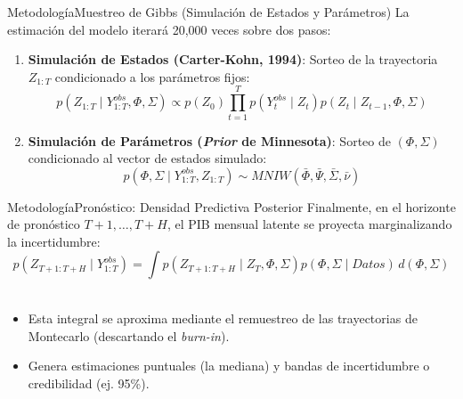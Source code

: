 \documentclass{beamer}
\begin{document}
\begin{frame}{Metodología}{Muestreo de Gibbs (Simulación de Estados y Parámetros)}\justifying
La estimación del modelo iterará 20,000 veces sobre dos pasos: \pause
\begin{enumerate}\justifying
    \item \textbf{Simulación de Estados (Carter-Kohn, 1994)}: Sorteo de la trayectoria $Z_{1:T}$ condicionado a los parámetros fijos: \pause
    \[
    p(Z_{1:T} \mid Y_{1:T}^{obs}, \Phi, \Sigma) \propto p(Z_0) \prod_{t=1}^T p(Y_t^{obs} \mid Z_t) p(Z_t \mid Z_{t-1}, \Phi, \Sigma)
    \] \pause
    \item \textbf{Simulación de Parámetros (\textit{Prior} de Minnesota)}: Sorteo de $(\Phi, \Sigma)$ condicionado al vector de estados simulado: \pause
    \[
    p(\Phi, \Sigma \mid Y_{1:T}^{obs}, Z_{1:T}) \sim MNIW(\bar{\Phi}, \bar{\Psi}, \bar{\Sigma}, \bar{\nu})
    \]
\end{enumerate}
\end{frame}

\begin{frame}{Metodología}{Pronóstico: Densidad Predictiva Posterior}\justifying
Finalmente, en el horizonte de pronóstico $T+1, \dots, T+H$, el PIB mensual latente se proyecta marginalizando la incertidumbre: \pause
\[
p(Z_{T+1:T+H} \mid Y_{1:T}^{obs}) = \int p(Z_{T+1:T+H} \mid Z_T, \Phi, \Sigma) p(\Phi, \Sigma \mid Datos) \, d(\Phi, \Sigma)
\] \pause \\ \vspace{0.3cm}
\begin{itemize}
    \item Esta integral se aproxima mediante el remuestreo de las trayectorias de Montecarlo (descartando el \textit{burn-in}).
    \item Genera estimaciones puntuales (la mediana) y bandas de incertidumbre o credibilidad (ej. 95\%).
\end{itemize}
\end{frame}
\end{document}
